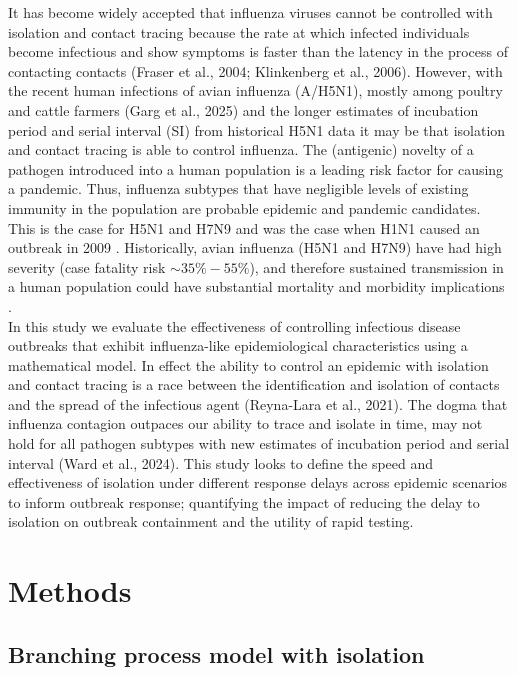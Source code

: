 \documentclass{article}
\begin{document}
It has become widely accepted that influenza viruses cannot be controlled with isolation and contact tracing because the rate at which infected individuals become infectious and show symptoms is faster than the latency in the process of contacting contacts (Fraser et al., 2004; Klinkenberg et al., 2006). However, with the recent human infections of avian influenza (A/H5N1), mostly among poultry and cattle farmers (Garg et al., 2025) and the longer estimates of incubation period and serial interval (SI) from historical H5N1 data \citep{Ward2024.12.11.24318702} it may be that isolation and contact tracing is able to control influenza. The (antigenic) novelty of a pathogen introduced into a human population is a leading risk factor for causing a pandemic. Thus, influenza subtypes that have negligible levels of existing immunity in the population are probable epidemic and pandemic candidates. This is the case for H5N1 and H7N9 \citep{tannerPandemicPotentialAvian2015} and was the case when H1N1 caused an outbreak in 2009 \citep{fraserPandemicPotentialStrain2009}. Historically, avian influenza (H5N1 and H7N9) have had high severity (case fatality risk $\sim 35\%-55\%$), and therefore sustained transmission in a human population could have substantial mortality and morbidity implications \citep{tannerPandemicPotentialAvian2015}. \\

In this study we evaluate the effectiveness of controlling infectious disease outbreaks that exhibit influenza-like epidemiological characteristics using a mathematical model. In effect the ability to control an epidemic with isolation and contact tracing is a race between the identification and isolation of contacts and the spread of the infectious agent (Reyna-Lara et al., 2021). The dogma that influenza contagion outpaces our ability to trace and isolate in time, may not hold for all pathogen subtypes with new estimates of incubation period and serial interval (Ward et al., 2024). This study looks to define the speed and effectiveness of isolation under different response delays across epidemic scenarios to inform outbreak response; quantifying the impact of reducing the delay to isolation on outbreak containment and the utility of rapid testing.

\section*{Methods}

\subsection*{Branching process model with isolation}
\end{document}
